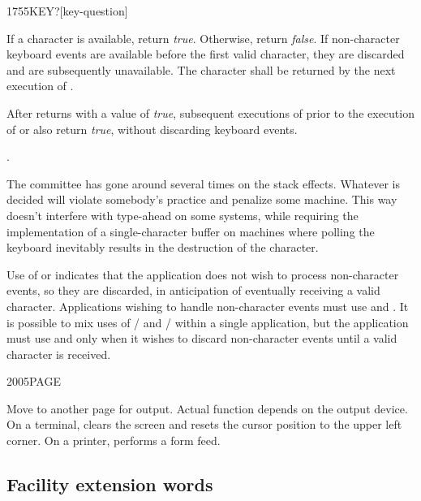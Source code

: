 \begin{worddef}[KEYq]{1755}{KEY?}[key-question]
\item {}

	If a character is available, return \emph{true}. Otherwise,
	return \emph{false}. If non-character keyboard events are
	available before the first valid character, they are discarded
	and are subsequently unavailable. The character shall be
	returned by the next execution of .

	After  returns with a value of \emph{true},
	subsequent executions of  prior to the execution
	of  or  also return \emph{true},
	without discarding keyboard events.

\see {}.

	\begin{rationale} %
		The committee has gone around several times on the
		stack effects. Whatever is decided will violate somebody's
		practice and penalize some machine. This way doesn't interfere
		with type-ahead on some systems, while requiring the
		implementation of a single-character buffer on machines where
		polling the keyboard inevitably results in the destruction of
		the character.

		Use of  or  indicates that the
		application does not wish to process non-character events,
		so they are discarded, in anticipation of eventually receiving
		a valid character. Applications wishing to handle non-character
		events must use  and . It is possible
		to mix uses of / and
		/ within a single application, but
		the application must use  and  only
		when it wishes to discard non-character events until a valid
		character is received.
\pagebreak
	\end{rationale}
\end{worddef}

\begin{worddef}{2005}{PAGE}
\item \stack{}{}

	Move to another page for output. Actual function depends on the
	output device. On a terminal,  clears the screen and
	resets the cursor position to the upper left corner. On a
	printer,  performs a form feed.
\end{worddef}


\subsection{Facility extension words} %
\extended

